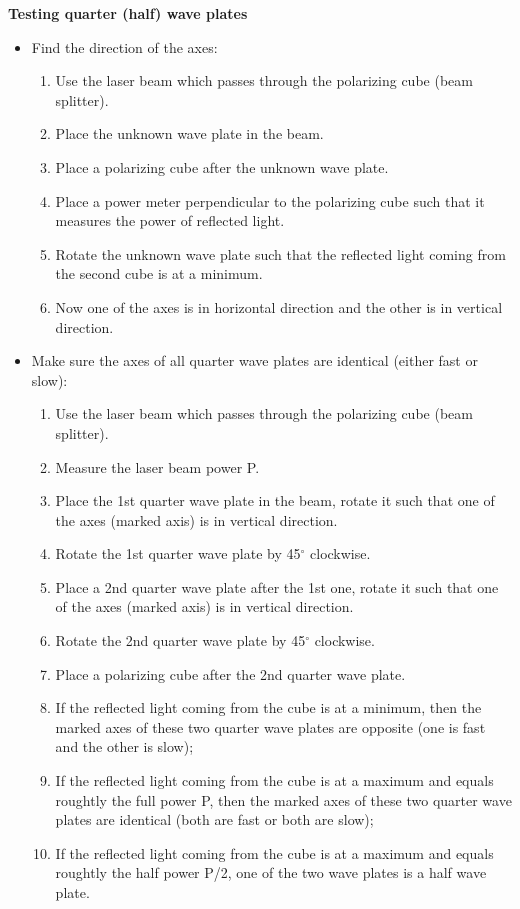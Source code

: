 {\medskip
\noindent
{\bf{Testing quarter (half) wave plates}}

\begin{itemize}
\item Find the direction of the axes:

\begin{enumerate}
\item Use the laser beam which passes through the polarizing cube (beam splitter).
\item Place the unknown wave plate in the beam.
\item Place a polarizing cube after the unknown wave plate.
\item Place a power meter perpendicular to the polarizing cube such that it
      measures the power of reflected light. 
\item Rotate the unknown wave plate such that the reflected light coming
  from the second cube is at a minimum.
\item Now one of the axes is in horizontal direction and the other is in
      vertical direction.
\end{enumerate}

\item Make sure the axes of all quarter wave plates are identical (either fast or slow):

\begin{enumerate}
\item Use the laser beam which passes through the polarizing cube (beam splitter).
\item Measure the laser beam power P.
\item Place the 1st quarter wave plate in the beam, rotate it such that one of the 
      axes (marked axis) is in vertical direction.
\item Rotate the 1st quarter wave plate by 45$^\circ$ clockwise.
\item Place a 2nd quarter wave plate after the 1st one, rotate it such that one of the 
      axes (marked axis) is in vertical direction.
\item Rotate the 2nd quarter wave plate by 45$^\circ$ clockwise.
\item Place a polarizing cube after the 2nd quarter wave plate.
\item If the reflected light coming from the cube is at a minimum, then the marked 
      axes of these two quarter wave plates are opposite (one is fast and the other 
      is slow);  
\item If the reflected light coming from the cube is at a maximum and equals roughtly 
      the full power P, then the marked 
      axes of these two quarter wave plates are identical (both are fast or both are 
      slow);  
\item If the reflected light coming from the cube is at a maximum and equals roughtly 
      the half power P/2, one of the two wave plates is a half wave plate.
\end{enumerate}
\end{itemize}

}

